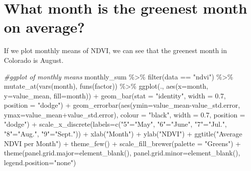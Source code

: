 \documentclass[
]{book}
\newenvironment{Shaded}{\begin{snugshade}}{\end{snugshade}}
\newcommand{\AttributeTok}[1]{\textcolor[rgb]{0.77,0.63,0.00}{#1}}
\newcommand{\CommentTok}[1]{\textcolor[rgb]{0.56,0.35,0.01}{\textit{#1}}}
\newcommand{\FloatTok}[1]{\textcolor[rgb]{0.00,0.00,0.81}{#1}}
\newcommand{\FunctionTok}[1]{\textcolor[rgb]{0.00,0.00,0.00}{#1}}
\newcommand{\NormalTok}[1]{#1}
\newcommand{\OtherTok}[1]{\textcolor[rgb]{0.56,0.35,0.01}{#1}}
\newcommand{\SpecialCharTok}[1]{\textcolor[rgb]{0.00,0.00,0.00}{#1}}
\newcommand{\StringTok}[1]{\textcolor[rgb]{0.31,0.60,0.02}{#1}}
\begin{document}
\hypertarget{what-month-is-the-greenest-month-on-average}{%
\section{What month is the greenest month on average?}\label{what-month-is-the-greenest-month-on-average}}

If we plot monthly means of NDVI, we can see that the greenest month in Colorado is August.

\begin{Shaded}
\begin{Highlighting}[]
\CommentTok{\#ggplot of monthly means}
\NormalTok{monthly\_sum }\SpecialCharTok{\%\textgreater{}\%}
  \FunctionTok{filter}\NormalTok{(data }\SpecialCharTok{==} \StringTok{"ndvi"}\NormalTok{) }\SpecialCharTok{\%\textgreater{}\%}
  \FunctionTok{mutate\_at}\NormalTok{(}\FunctionTok{vars}\NormalTok{(month), }\FunctionTok{funs}\NormalTok{(factor)) }\SpecialCharTok{\%\textgreater{}\%}
\FunctionTok{ggplot}\NormalTok{(., }\FunctionTok{aes}\NormalTok{(}\AttributeTok{x=}\NormalTok{month, }\AttributeTok{y=}\NormalTok{value\_mean, }\AttributeTok{fill=}\NormalTok{month)) }\SpecialCharTok{+} 
  \FunctionTok{geom\_bar}\NormalTok{(}\AttributeTok{stat =} \StringTok{"identity"}\NormalTok{, }\AttributeTok{width =} \FloatTok{0.7}\NormalTok{, }\AttributeTok{position =} \StringTok{"dodge"}\NormalTok{) }\SpecialCharTok{+}
  \FunctionTok{geom\_errorbar}\NormalTok{(}\FunctionTok{aes}\NormalTok{(}\AttributeTok{ymin=}\NormalTok{value\_mean}\SpecialCharTok{{-}}\NormalTok{value\_std.error, }\AttributeTok{ymax=}\NormalTok{value\_mean}\SpecialCharTok{+}\NormalTok{value\_std.error), }
                \AttributeTok{colour =} \StringTok{"black"}\NormalTok{, }\AttributeTok{width =} \FloatTok{0.7}\NormalTok{, }\AttributeTok{position =} \StringTok{"dodge"}\NormalTok{) }\SpecialCharTok{+}
  \FunctionTok{scale\_x\_discrete}\NormalTok{(}\AttributeTok{labels=}\FunctionTok{c}\NormalTok{(}\StringTok{"5"}\OtherTok{=}\StringTok{"May"}\NormalTok{, }\StringTok{"6"}\OtherTok{=}\StringTok{"June"}\NormalTok{, }\StringTok{"7"}\OtherTok{=}\StringTok{"Jul."}\NormalTok{, }\StringTok{"8"}\OtherTok{=}\StringTok{"Aug."}\NormalTok{, }\StringTok{"9"}\OtherTok{=}\StringTok{"Sept."}\NormalTok{)) }\SpecialCharTok{+}
  \FunctionTok{xlab}\NormalTok{(}\StringTok{"Month"}\NormalTok{) }\SpecialCharTok{+}  \FunctionTok{ylab}\NormalTok{(}\StringTok{"NDVI"}\NormalTok{) }\SpecialCharTok{+}
  \FunctionTok{ggtitle}\NormalTok{(}\StringTok{"Average NDVI per Month"}\NormalTok{) }\SpecialCharTok{+}
  \FunctionTok{theme\_few}\NormalTok{() }\SpecialCharTok{+}
  \FunctionTok{scale\_fill\_brewer}\NormalTok{(}\AttributeTok{palette =} \StringTok{"Greens"}\NormalTok{) }\SpecialCharTok{+}
  \FunctionTok{theme}\NormalTok{(}\AttributeTok{panel.grid.major=}\FunctionTok{element\_blank}\NormalTok{(), }
        \AttributeTok{panel.grid.minor=}\FunctionTok{element\_blank}\NormalTok{(), }\AttributeTok{legend.position=}\StringTok{"none"}\NormalTok{)}
\end{Highlighting}
\end{Shaded}
\end{document}
